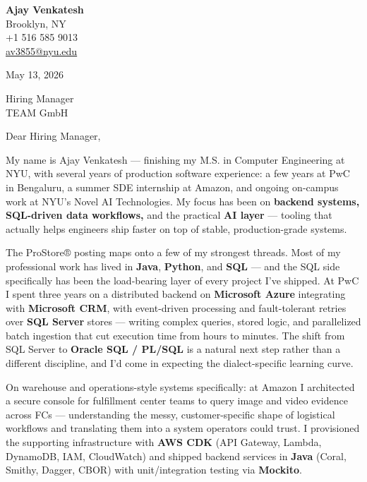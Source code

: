 \documentclass[letterpaper,11pt]{article}
\begin{document}
\begin{flushleft}
\textbf{\large Ajay Venkatesh} \\
Brooklyn, NY \\
+1 516 585 9013 \\
\href{mailto:av3855@nyu.edu}{av3855@nyu.edu}
\end{flushleft}

\vspace{10pt}

May 13, 2026

\vspace{6pt}

Hiring Manager \\
TEAM GmbH

\vspace{10pt}

Dear Hiring Manager,

My name is Ajay Venkatesh --- finishing my M.S. in Computer Engineering at NYU, with several years of production software experience: a few years at PwC in Bengaluru, a summer SDE internship at Amazon, and ongoing on-campus work at NYU's Novel AI Technologies. My focus has been on \textbf{backend systems, SQL-driven data workflows,} and the practical \textbf{AI layer} --- tooling that actually helps engineers ship faster on top of stable, production-grade systems.

The ProStore® posting maps onto a few of my strongest threads. Most of my professional work has lived in \textbf{Java}, \textbf{Python}, and \textbf{SQL} --- and the SQL side specifically has been the load-bearing layer of every project I've shipped. At PwC I spent three years on a distributed backend on \textbf{Microsoft Azure} integrating with \textbf{Microsoft CRM}, with event-driven processing and fault-tolerant retries over \textbf{SQL Server} stores --- writing complex queries, stored logic, and parallelized batch ingestion that cut execution time from hours to minutes. The shift from SQL Server to \textbf{Oracle SQL / PL/SQL} is a natural next step rather than a different discipline, and I'd come in expecting the dialect-specific learning curve.

On warehouse and operations-style systems specifically: at Amazon I architected a secure console for fulfillment center teams to query image and video evidence across FCs --- understanding the messy, customer-specific shape of logistical workflows and translating them into a system operators could trust. I provisioned the supporting infrastructure with \textbf{AWS CDK} (API Gateway, Lambda, DynamoDB, IAM, CloudWatch) and shipped backend services in \textbf{Java} (Coral, Smithy, Dagger, CBOR) with unit/integration testing via \textbf{Mockito}.
\end{document}
